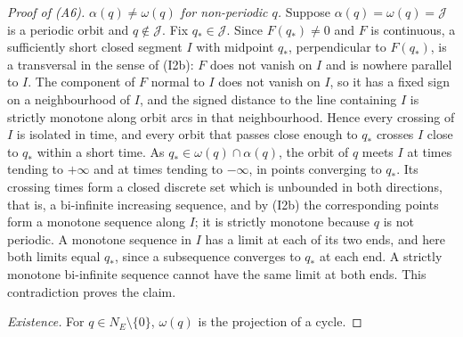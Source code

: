 \begin{proof}[Proof of (A6)]
\emph{$\alpha(q)\neq\omega(q)$ for non-periodic $q$.} Suppose $\alpha(q)=\omega(q)=\mathcal J$ is a periodic orbit and $q\notin\mathcal J$. Fix $q_\ast\in\mathcal J$. Since $F(q_\ast)\ne0$ and $F$ is continuous, a sufficiently short closed segment $I$ with midpoint $q_\ast$, perpendicular to $F(q_\ast)$, is a transversal in the sense of (I2b): $F$ does not vanish on $I$ and is nowhere parallel to $I$. The component of $F$ normal to $I$ does not vanish on $I$, so it has a fixed sign on a neighbourhood of $I$, and the signed distance to the line containing $I$ is strictly monotone along orbit arcs in that neighbourhood. Hence every crossing of $I$ is isolated in time, and every orbit that passes close enough to $q_\ast$ crosses $I$ close to $q_\ast$ within a short time. As $q_\ast\in\omega(q)\cap\alpha(q)$, the orbit of $q$ meets $I$ at times tending to $+\infty$ and at times tending to $-\infty$, in points converging to $q_\ast$. Its crossing times form a closed discrete set which is unbounded in both directions, that is, a bi-infinite increasing sequence, and by (I2b) the corresponding points form a monotone sequence along $I$; it is strictly monotone because $q$ is not periodic. A monotone sequence in $I$ has a limit at each of its two ends, and here both limits equal $q_\ast$, since a subsequence converges to $q_\ast$ at each end. A strictly monotone bi-infinite sequence cannot have the same limit at both ends. This contradiction proves the claim.

\emph{Existence.} For $q\in N_E\setminus\{0\}$, $\omega(q)$ is the projection of a cycle.
\end{proof}

